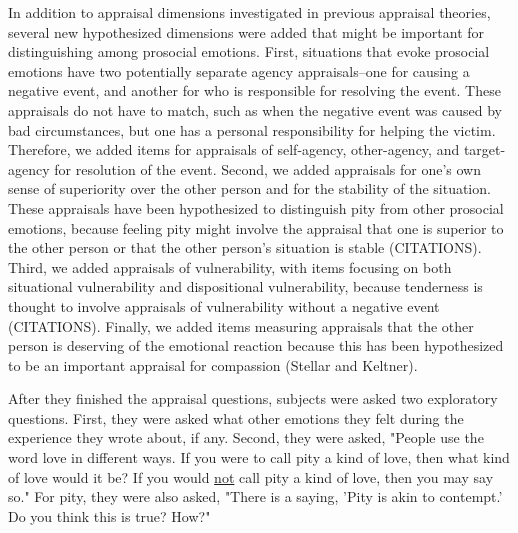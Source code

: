 \documentclass[man]{apa6}
\begin{document}
In addition to appraisal dimensions investigated in previous appraisal theories, several new hypothesized dimensions were added that might be important for distinguishing among prosocial emotions. First, situations that evoke prosocial emotions have two potentially separate agency appraisals--one for causing a negative event, and another for who is responsible for resolving the event. These appraisals do not have to match, such as when the negative event was caused by bad circumstances, but one has a personal responsibility for helping the victim. Therefore, we added items for appraisals of self-agency, other-agency, and target-agency for resolution of the event. Second, we added appraisals for one's own sense of superiority over the other person and for the stability of the situation. These appraisals have been hypothesized to distinguish pity from other prosocial emotions, because feeling pity might involve the appraisal that one is superior to the other person or that the other person's situation is stable (CITATIONS). Third, we added appraisals of vulnerability, with items focusing on both situational vulnerability and dispositional vulnerability, because tenderness is thought to involve appraisals of vulnerability without a negative event (CITATIONS). Finally, we added items measuring appraisals that the other person is deserving of the emotional reaction because this has been hypothesized to be an important appraisal for compassion (Stellar and Keltner). 

After they finished the appraisal questions, subjects were asked two exploratory questions. First, they were asked what other emotions they felt during the experience they wrote about, if any. Second, they were asked, "People use the word love in different ways. If you were to call pity a kind of love, then what kind of love would it be? If you would \underline{not} call pity a kind of love, then you may say so." For pity, they were also asked, "There is a saying, 'Pity is akin to contempt.' Do you think this is true? How?"
\end{document}

